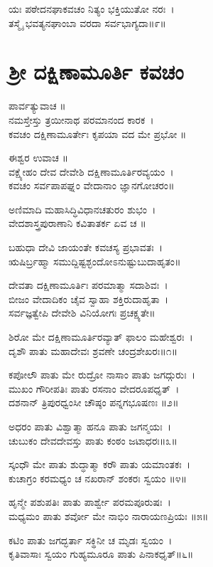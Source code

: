 ಯಃ ಪಠೇದನಘಾಕವಚಂ ನಿತ್ಯಂ ಭಕ್ತಿಯುತೋ ನರಃ~।\\
ತಸ್ಮೈ ಭವತ್ಯನಘಾಂಬಾ ವರದಾ ಸರ್ವಭಾಗ್ಯದಾ॥೯॥
\section{ಶ್ರೀ ದಕ್ಷಿಣಾಮೂರ್ತಿ ಕವಚಂ}
ಪಾರ್ವತ್ಯುವಾಚ ॥\\
ನಮಸ್ತೇಸ್ತು ತ್ರಯೀನಾಥ ಪರಮಾನಂದ ಕಾರಕ~।\\
ಕವಚಂ ದಕ್ಷಿಣಾಮೂರ್ತೇಃ ಕೃಪಯಾ ವದ ಮೇ ಪ್ರಭೋ ॥

ಈಶ್ವರ ಉವಾಚ ॥\\
ವಕ್ಷ್ಯೇಹಂ ದೇವ ದೇವೇಶಿ ದಕ್ಷಿಣಾಮೂರ್ತಿರವ್ಯಯಂ~।\\
ಕವಚಂ ಸರ್ವಪಾಪಘ್ನಂ ವೇದಾನಾಂ ಜ್ಞಾನಗೋಚರಂ॥

ಅಣಿಮಾದಿ ಮಹಾಸಿದ್ಧಿವಿಧಾನಚತುರಂ ಶುಭಂ~।\\
ವೇದಶಾಸ್ತ್ರಪುರಾಣಾನಿ ಕವಿತಾತರ್ಕ ಏವ ಚ ॥

ಬಹುಧಾ ದೇವಿ ಜಾಯಂತೇ ಕವಚಸ್ಯ ಪ್ರಭಾವತಃ~।\\
ಋಷಿರ್ಬ್ರಹ್ಮಾ ಸಮುದ್ದಿಷ್ಟಶ್ಛಂದೋಽನುಷ್ಟುಬುದಾಹೃತಂ॥

ದೇವತಾ ದಕ್ಷಿಣಾಮೂರ್ತಿಃ ಪರಮಾತ್ಮಾ ಸದಾಶಿವಃ~।\\
ಬೀಜಂ ವೇದಾದಿಕಂ ಚೈವ ಸ್ವಾಹಾ ಶಕ್ತಿರುದಾಹೃತಾ~।\\
ಸರ್ವಜ್ಞತ್ವೇಪಿ ದೇವೇಶಿ ವಿನಿಯೋಗಃ ಪ್ರಚಕ್ಷ್ಯತೇ॥


ಶಿರೋ ಮೇ ದಕ್ಷಿಣಾಮೂರ್ತಿರವ್ಯಾತ್ ಫಾಲಂ ಮಹೇಶ್ವರಃ~।\\
ದೃಶೌ ಪಾತು ಮಹಾದೇವಃ ಶ್ರವಣೇ ಚಂದ್ರಶೇಖರಃ॥೧॥

ಕಪೋಲೌ ಪಾತು ಮೇ ರುದ್ರೋ ನಾಸಾಂ ಪಾತು ಜಗದ್ಗುರುಃ~।\\
ಮುಖಂ ಗೌರೀಪತಿಃ ಪಾತು ರಸನಾಂ ವೇದರೂಪಧೃತ್~।\\
ದಶನಾನ್ ತ್ರಿಪುರಧ್ವಂಸೀ ಚೌಷ್ಠಂ ಪನ್ನಗಭೂಷಣಃ ॥೨॥

ಅಧರಂ ಪಾತು ವಿಶ್ವಾತ್ಮಾ ಹನೂ ಪಾತು ಜಗನ್ಮಯಃ~।\\
ಚುಬುಕಂ ದೇವದೇವಸ್ತು ಪಾತು ಕಂಠಂ ಜಟಾಧರಃ॥೩॥

ಸ್ಕಂಧೌ ಮೇ ಪಾತು ಶುದ್ಧಾತ್ಮಾ ಕರೌ ಪಾತು ಯಮಾಂತಕಃ~।\\
ಕುಚಾಗ್ರಂ ಕರಮಧ್ಯಂ ಚ ನಖರಾನ್ ಶಂಕರಃ ಸ್ವಯಂ ॥೪॥

ಹೃನ್ಮೇ ಪಶುಪತಿಃ ಪಾತು ಪಾರ್ಶ್ವೇ ಪರಮಪೂರುಷಃ~।\\
ಮಧ್ಯಮಂ ಪಾತು ಶರ್ವೋ ಮೇ ನಾಭಿಂ ನಾರಾಯಣಪ್ರಿಯಃ ॥೫॥

ಕಟಿಂ ಪಾತು ಜಗದ್ಭರ್ತಾ ಸಕ್ಥಿನೀ ಚ ಮೃಡಃ ಸ್ವಯಂ~।\\
ಕೃತಿವಾಸಾಃ ಸ್ವಯಂ ಗುಹ್ಯಮೂರೂ ಪಾತು ಪಿನಾಕಧೃತ್॥೬॥

